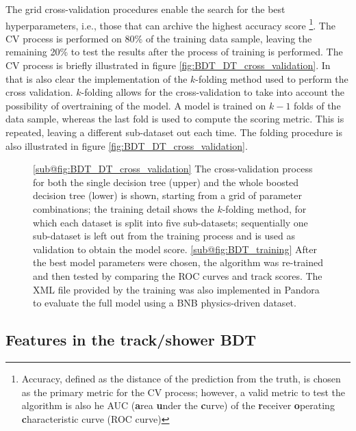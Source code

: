 The grid cross-validation procedures enable the search for the best hyperparameters, i.e., those that can archive the highest accuracy score \footnote{Accuracy, defined as the distance of the prediction from the truth, is chosen as the primary metric for the CV process; however, a valid metric to test the algorithm is also he AUC (\textbf{a}rea \textbf{u}nder the \textbf{c}urve) of the \textbf{r}eceiver \textbf{o}perating \textbf{c}haracteristic curve (ROC curve)}. The CV process is performed on 80\% of the training data sample, leaving the remaining 20\% to test the results after the process of training is performed. The CV process is briefly illustrated in figure \ref{fig:BDT_DT_cross_validation}. In that is also clear the implementation of the $k$-folding method used to perform the cross validation. $k$-folding allows for the cross-validation to take into account the possibility of overtraining of the model. A model is trained on $k-1$ folds of the data sample, whereas the last fold is used to compute the scoring metric. This is repeated, leaving a different sub-dataset out each time. The folding procedure is also illustrated in figure \ref{fig:BDT_DT_cross_validation}. 

\begin{figure*}
    \hfill
    \hfill
    \hfill
    \phantom{.}
    \caption{\ref{sub@fig:BDT_DT_cross_validation} The cross-validation process for both the single decision tree (upper) and the whole boosted decision tree (lower) is shown, starting from a grid of parameter combinations; the training detail shows the $k$-folding method, for which each dataset is split into five sub-datasets; sequentially one sub-dataset is left out from the training process and is used as validation to obtain the model score. \ref{sub@fig:BDT_training} After the best model parameters were chosen, the algorithm was re-trained and then tested by comparing the ROC curves and track scores. The XML file provided by the training was also implemented in Pandora to evaluate the full model using a BNB physics-driven dataset.}
    \label{fig:BDT_DT}
\end{figure*}

\subsection{Features in the track/shower BDT}

